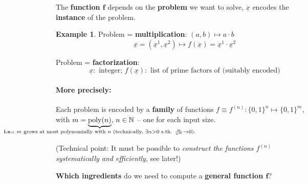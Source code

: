 \documentclass[a4paper, 12pt]{article}
\theoremstyle{plain}
\theoremstyle{definition}
\newtheorem*{example}{Example}
\theoremstyle{remark}
\DeclareMathOperator{\poly}{poly}
\begin{document}
The \textbf{function $\bm{f}$} depends on the \textbf{problem} we want to solve, $\underline{x}$ encodes the \textbf{instance} of the problem.

\begin{example}
  Problem = \textbf{multiplication}: $(a,b)\mapsto a \cdot b$
  \begin{equation*}
    \underline{x}=(\underline{x}^1, \underline{x}^2) \mapsto f(\underline{x}) =\underline{x}^1 \cdot \underline{x}^2
  \end{equation*}

  Problem = \textbf{factorization}:
  \begin{equation*}
    \underline{x}: \text{ integer};\, f(\underline{x}): \text{ list of prime factors of (suitably encoded)}
  \end{equation*}
\end{example}

\paragraph{More precisely:} Each problem is encoded by a \textbf{family} of functions $f\equiv f^{(n)}:\{0,1\}^n\mapsto \{0,1\}^m$, with $m = \underbrace{\poly(n)}_{\mathclap{\text{\textbf{i.e.:} $m$ grows at most polynomially with $n$ (technically, }\exists \alpha > 0 \text{ s.th. }\frac{m}{n^\alpha}\rightarrow0).}},\,n \in \mathbb{N}$ -- one for each input size.

(Technical point: It must be possible to \emph{construct the functions $f^{(n)}$ systematically and efficiently}, see later!)

\textbf{Which ingredients} do we need to compute a \textbf{general function $\bm{f}$}?
\end{document}

